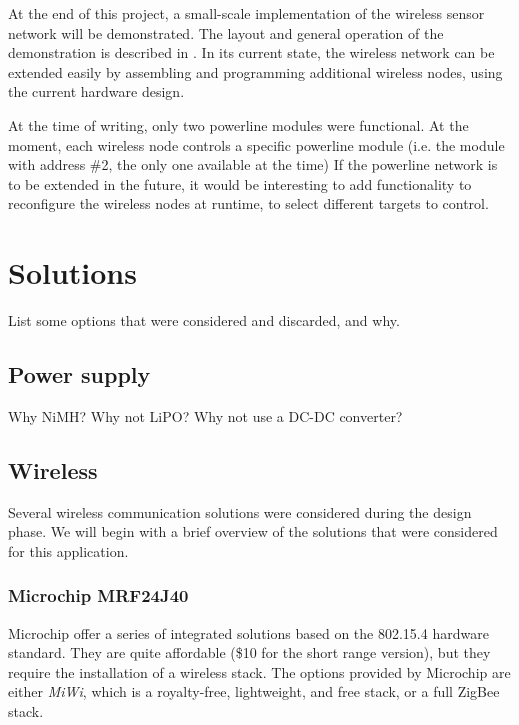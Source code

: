 At the end of this project, a small-scale implementation of the wireless sensor
network will be demonstrated. The layout and general operation of the
demonstration is described in . In its current state,
the wireless network can be extended easily by assembling and programming
additional wireless nodes, using the current hardware design.

At the time of writing, only two powerline modules were functional. At the
moment, each wireless node controls a specific powerline module (i.e. the module
with address \#2, the only one available at the time) If the powerline network is
to be extended in the future, it would be interesting to add functionality to
reconfigure the wireless nodes at runtime, to select different targets to
control.

\section{Solutions}
List some options that were considered and discarded, and why.


\subsection{Power supply}
Why NiMH? Why not LiPO? Why not use a DC-DC converter?


\subsection{Wireless}

Several wireless communication solutions were considered during the design
phase. We will begin with a brief overview of the solutions that were considered
for this application.

\subsubsection{Microchip MRF24J40}

Microchip offer a series of integrated solutions
based on the 802.15.4
hardware standard. They are quite affordable (\$10 for the short range version),
but they require the installation of a wireless stack. The options provided by
Microchip are either \emph{MiWi}, which is a royalty-free, lightweight, and free
stack, or a full ZigBee stack.

